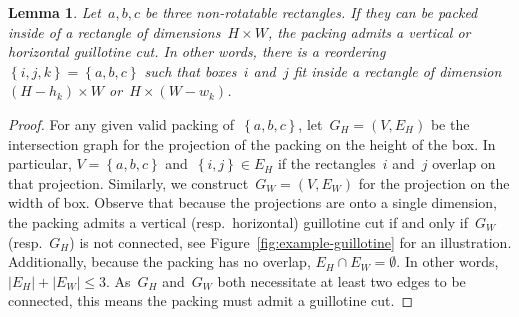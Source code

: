 \documentclass[a4paper,10pt]{article}
\newcommand{\brackets}[1]{\left\{ #1 \right\}}
\newtheorem{lemma}[theorem]{Lemma}
\theoremstyle{definition}
\begin{document}
\begin{lemma}
  \label{lemma:3fit}
  Let~$a, b, c$ be three non-rotatable rectangles.
  If they can be packed inside of a rectangle of dimensions~$H\times W$, the packing admits a vertical or horizontal guillotine cut.
  In other words, there is a reordering~$\brackets{i, j, k} = \brackets{a, b, c}$ such that boxes~$i$ and~$j$ fit inside a rectangle of dimension~$(H-h_k)\times W$ or~$H \times (W-w_k)$.
\end{lemma}
%
\begin{proof}
  For any given valid packing of~$\brackets{a, b, c}$, let~$G_H = (V, E_H)$ be the intersection graph for the projection of the packing on the height of the box. 
  In particular, $V=\brackets{a, b, c}$ and~$\brackets{i, j}\in E_H$ if the rectangles~$i$ and~$j$ overlap on that projection.
  Similarly, we construct~$G_W = (V, E_W)$ for the projection on the width of box.
  Observe that because the projections are onto a single dimension, the packing admits a vertical (resp.\ horizontal) guillotine cut if and only if~$G_W$ (resp.\ $G_H$) is not connected, see Figure~\ref{fig:example-guillotine} for an illustration.
  Additionally, because the packing has no overlap, $E_H \cap E_W = \emptyset$.
  In other words, $|E_H| + |E_W| \leq 3$.
  As~$G_H$ and~$G_W$ both necessitate at least two edges to be connected, this means the packing must admit a guillotine cut.
\end{proof}
%
\end{document}
